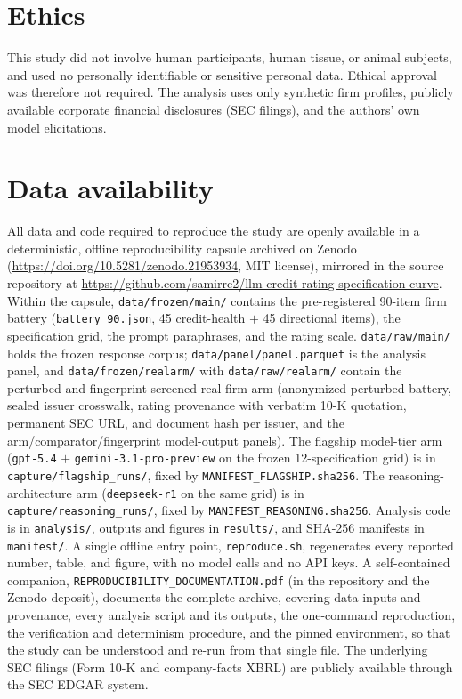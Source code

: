 \documentclass[a4paper,fleqn]{cas-sc}
\begin{document}
\section*{Ethics}
This study did not involve human participants, human tissue, or animal subjects, and used no personally
identifiable or sensitive personal data. Ethical approval was therefore not required. The analysis uses
only synthetic firm profiles, publicly available corporate financial disclosures (SEC filings), and the
authors' own model elicitations.

\section*{Data availability}
All data and code required to reproduce the study are openly available in a deterministic, offline
reproducibility capsule archived on Zenodo \citep{chincholikar2026capsule}
(\url{https://doi.org/10.5281/zenodo.21953934}, MIT license), mirrored in the source repository at
\url{https://github.com/samirrc2/llm-credit-rating-specification-curve}.
Within the capsule, \texttt{data/frozen/main/} contains the pre-registered 90-item firm battery
(\texttt{battery\_90.json}, 45 credit-health $+$ 45 directional items), the specification grid, the prompt
paraphrases, and the rating scale. \texttt{data/raw/main/} holds the frozen
response corpus; \texttt{data/panel/panel.parquet} is the analysis panel, and
\texttt{data/frozen/realarm/} with \texttt{data/raw/realarm/} contain the perturbed and fingerprint-screened real-firm arm
(anonymized perturbed battery, sealed issuer crosswalk, rating provenance with verbatim 10-K quotation,
permanent SEC URL, and document hash per issuer, and the arm/comparator/fingerprint model-output panels).
The flagship model-tier arm (\texttt{gpt-5.4} $+$ \texttt{gemini-3.1-pro-preview} on the frozen
12-specification grid) is in \texttt{capture/flagship\_runs/}, fixed by \texttt{MANIFEST\_FLAGSHIP.sha256}.
The reasoning-architecture arm (\texttt{deepseek-r1} on the same grid) is in \texttt{capture/reasoning\_runs/},
fixed by \texttt{MANIFEST\_REASONING.sha256}.
Analysis code is in \texttt{analysis/}, outputs and figures in \texttt{results/}, and SHA-256 manifests in
\texttt{manifest/}. A single offline entry point, \texttt{reproduce.sh}, regenerates every reported
number, table, and figure, with no model calls and no API keys. A self-contained companion,
\texttt{REPRODUCIBILITY\_DOCUMENTATION.pdf} (in the repository and the Zenodo deposit), documents the
complete archive, covering data inputs and provenance, every analysis script and its outputs, the one-command
reproduction, the verification and determinism procedure, and the pinned environment, so that the study
can be understood and re-run from that single file. The underlying SEC filings (Form 10-K and
company-facts XBRL) are publicly available through the SEC EDGAR system.



\end{document}
